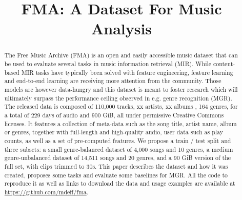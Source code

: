\documentclass{article}
\title{FMA: A Dataset For Music Analysis}
\newcommand{\todo}[1]{{\color{red} #1 }}
\begin{document}
\maketitle

\begin{abstract}
The Free Music Archive (FMA) is an open and easily accessible music dataset that can be used to evaluate several tasks in music information retrieval (MIR).
While content-based MIR tasks have typically been solved with feature engineering,
feature learning and end-to-end learning %
are receiving more attention from the community. 
Those models are however data-hungry and this dataset is meant to foster research which will ultimately surpass the performance ceiling observed in e.g. genre recognition (MGR).
The released data is composed of \todo{110,000 tracks, xx artists, xx albums}, 164 genres, for a total of 229 days of audio and 900 GiB, all under permissive Creative Commons licenses.
It features a collection of meta-data such as the song title, artist name, album or genres, together with full-length and high-quality audio, user data such as play counts, as well as a set of pre-computed features. We propose a train / test split and three subsets: a small genre-balanced dataset of 4,000 songs and 10 genres, a medium genre-unbalanced dataset of 14,511 songs and 20 genres, and a 90 GiB version of the full set, with clips trimmed to 30s.
This paper describes the dataset and how it was created, proposes some tasks and evaluate some baselines for MGR.
All the code to reproduce it as well as links to download the data and usage examples are available at \url{https://github.com/mdeff/fma}.


\end{abstract}
\end{document}
